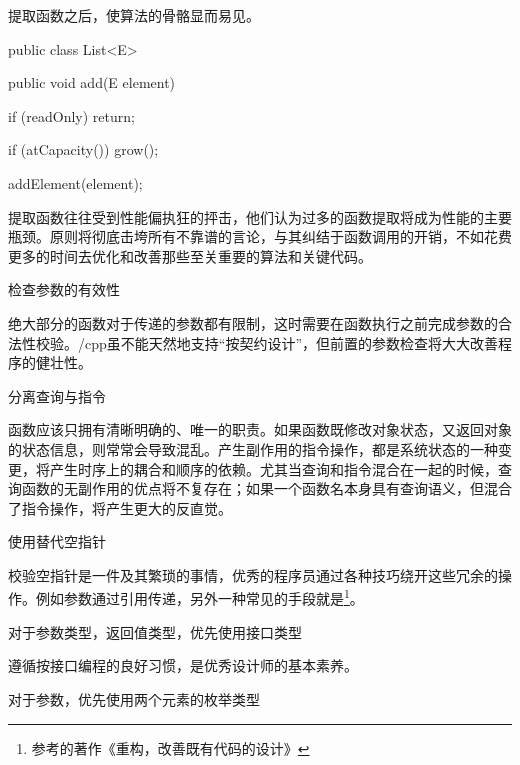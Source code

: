 \begin{content}
提取函数之后，使算法的骨骼显而易见。

\begin{leftbar}
\begin{java}[caption={java.util.List}]
public class List<E> {
   public void add(E element) {
      if (readOnly)
         return;
      
      if (atCapacity())
         grow();
      
      addElement(element);
   }
}
\end{java}
\end{leftbar}

提取函数往往受到性能偏执狂的抨击，他们认为过多的函数提取将成为性能的主要瓶颈。原则将彻底击垮所有不靠谱的言论，与其纠结于函数调用的开销，不如花费更多的时间去优化和改善那些至关重要的算法和关键代码。

\begin{regulation}
检查参数的有效性
\end{regulation}

绝大部分的函数对于传递的参数都有限制，这时需要在函数执行之前完成参数的合法性校验。\clang{}/cpp{}虽不能天然地支持“按契约设计”，但前置的参数检查将大大改善程序的健壮性。

\begin{regulation}
分离查询与指令
\end{regulation}

函数应该只拥有清晰明确的、唯一的职责。如果函数既修改对象状态，又返回对象的状态信息，则常常会导致混乱。产生副作用的指令操作，都是系统状态的一种变更，将产生时序上的耦合和顺序的依赖。尤其当查询和指令混合在一起的时候，查询函数的无副作用的优点将不复存在；如果一个函数名本身具有查询语义，但混合了指令操作，将产生更大的反直觉。

\begin{regulation}
使用替代空指针
\end{regulation}

校验空指针是一件及其繁琐的事情，优秀的程序员通过各种技巧绕开这些冗余的操作。例如参数通过引用传递，另外一种常见的手段就是\footnote{参考的著作《重构，改善既有代码的设计》}。

\begin{regulation}
对于参数类型，返回值类型，优先使用接口类型
\end{regulation}

遵循按接口编程的良好习惯，是优秀设计师的基本素养。

\begin{regulation}
对于参数，优先使用两个元素的枚举类型
\end{regulation}


\end{content}
